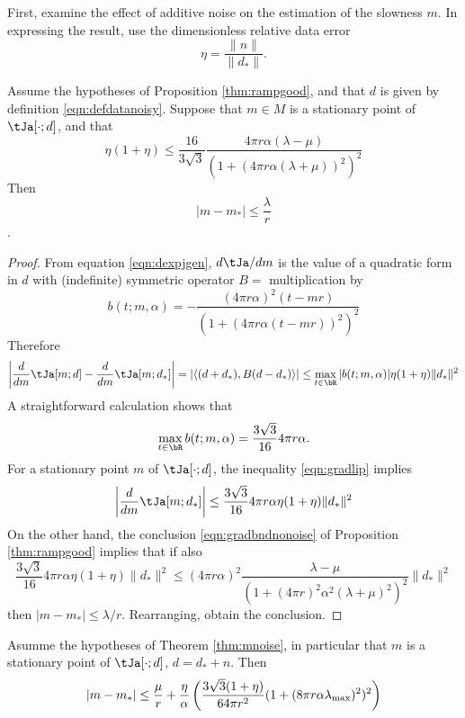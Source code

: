 First, examine the effect of additive noise on the estimation of the
slowness $m$. In expressing the result, use the dimensionless
relative data error
\begin{equation}
  \label{eqn:defeta}
  \eta = \frac{\|n\|}{\|d_*\|}. 
\end{equation}

\begin{proposition}
  \label{thm:mnoise}
  Assume the hypotheses of Proposition \ref{thm:rampgood}, and that $d$ is
  given by definition \ref{eqn:defdatanoisy}. Suppose that $m \in M$
  is a stationary point of $\tJa[\cdot;d]$, and that
  \begin{equation}
    \label{eqn:mnoisebnd}
    \eta(1+\eta) \le \frac{16}{3\sqrt{3}}\frac{4\pi r \alpha
      (\lambda-\mu)}{(1+(4\pi r\alpha(\lambda+\mu))^2)^2}
  \end{equation}
  Then
  \begin{equation}
    \label{eqn:mnoisebndfin}
    |m-m_*| \le \frac{\lambda}{r}
  \end{equation}.
\end{proposition}

\begin{proof}
  From equation \ref{eqn:dexpjgen}, $d \tJa / dm$ is the
value of a quadratic form in $d$ with (indefinite) symmetric operator
$B = $ multiplication by
\[
  b(t;m,\alpha)  = -\frac{(4 \pi r \alpha)^2 (t-mr)}{(1+(4\pi r \alpha (t-mr))^2)^{2}}
\]
Therefore
\begin{equation}
  \label{eqn:gradlip}
  \left|\frac{d}{dm}\tJa[m;d]-\frac{d}{dm}\tJa[m;d_*]\right| =
  |\langle (d+d_*),B(d-d_*)\rangle| \le \max_{t \in
    \bR}|b(t;m,\alpha)|\eta(1+\eta)\|d_*\|^2
\end{equation}
A straightforward calculation shows that
\[
  \max_{t \in \bR} b(t;m,\alpha) = \frac{3\sqrt{3}}{16} 4\pi r\alpha.
\]
For a stationary point $m$ of
$\tJa[\cdot;d]$, the inequality \ref{eqn:gradlip} implies
\[
  \left|\frac{d}{dm}\tJa[m;d_*]\right| \le \frac{3\sqrt{3}}{16} 4\pi
  r\alpha \eta(1+\eta)\|d_*\|^2
\]
On the other hand, the conclusion \ref{eqn:gradbndnonoise} of Proposition
\ref{thm:rampgood} implies that if also
\[
  \frac{3\sqrt{3}}{16} 4\pi r\alpha \eta(1+\eta)\|d_*\|^2 \le (4 \pi r
  \alpha)^2 \frac{\lambda-\mu}{(1+(4\pi r)^2\alpha^2
    (\lambda+\mu)^2)^{2}} \|d_*\|^2
\]
then $|m-m_*|\le \lambda/r$. Rearranging, obtain the conclusion.
\end{proof}

\begin{corollary}
  \label{thm:mnoisecor}
  Asumme the hypotheses of Theorem \ref{thm:mnoise}, in particular
  that $m$ is a stationary point of $\tJa[\cdot;d]$, $d=d_*+n$. Then
  \begin{equation}
    \label{eqn:mnoisecor}
    |m-m_*| \le \frac{\mu}{r} + \frac{\eta}{\alpha} \left(\frac{3\sqrt{3}(1+\eta)}{64\pi r^2}(1+(8\pi r \alpha
      \lambda_{\rm max})^2)^2\right)
  \end{equation}
\end{corollary}

